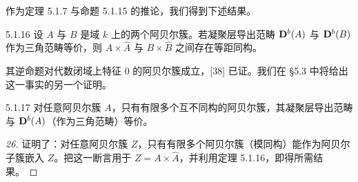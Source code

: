 作为定理 5.1.7 与命题 5.1.15 的推论，我们得到下述结果。

\begin{theorem}{5.1.16}
设 $A$ 与 $B$ 是域 $k$ 上的两个阿贝尔簇。若凝聚层导出范畴 $\mathbf{D}^{b}(A)$ 与 $\mathbf{D}^{b}(B)$ 作为三角范畴等价，则 $A\times\hat A$ 与 $B\times\hat B$ 之间存在等距同构。
\end{theorem}

其逆命题对代数闭域上特征 $0$ 的阿贝尔簇成立，[38] 已证。我们在 §5.3 中将给出这一事实的另一个证明。

\begin{corollary}{5.1.17}
对任意阿贝尔簇 $A$，只有有限多个互不同构的阿贝尔簇，其凝聚层导出范畴与 $\mathbf{D}^{b}(A)$（作为三角范畴）等价。
\end{corollary}

\begin{proof}
[26] 证明了：对任意阿贝尔簇 $Z$，只有有限多个阿贝尔簇（模同构）能作为阿贝尔子簇嵌入 $Z$。把这一断言用于 $Z=A\times\hat A$，并利用定理 5.1.16，即得所需结果。
\end{proof}
